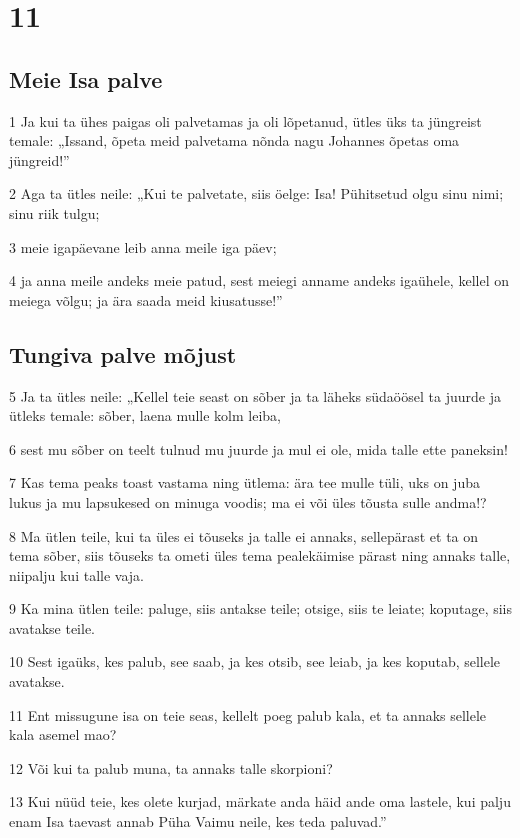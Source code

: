 \chapter{11}

\section*{Meie Isa palve}

\par 1 Ja kui ta ühes paigas oli palvetamas ja oli lõpetanud, ütles üks ta jüngreist temale: „Issand, õpeta meid palvetama nõnda nagu Johannes õpetas oma jüngreid!”
\par 2 Aga ta ütles neile: „Kui te palvetate, siis öelge: Isa! Pühitsetud olgu sinu nimi; sinu riik tulgu;
\par 3 meie igapäevane leib anna meile iga päev;
\par 4 ja anna meile andeks meie patud, sest meiegi anname andeks igaühele, kellel on meiega võlgu; ja ära saada meid kiusatusse!”

\section*{Tungiva palve mõjust}

\par 5 Ja ta ütles neile: „Kellel teie seast on sõber ja ta läheks südaöösel ta juurde ja ütleks temale: sõber, laena mulle kolm leiba,
\par 6 sest mu sõber on teelt tulnud mu juurde ja mul ei ole, mida talle ette paneksin!
\par 7 Kas tema peaks toast vastama ning ütlema: ära tee mulle tüli, uks on juba lukus ja mu lapsukesed on minuga voodis; ma ei või üles tõusta sulle andma!?
\par 8 Ma ütlen teile, kui ta üles ei tõuseks ja talle ei annaks, sellepärast et ta on tema sõber, siis tõuseks ta ometi üles tema pealekäimise pärast ning annaks talle, niipalju kui talle vaja.
\par 9 Ka mina ütlen teile: paluge, siis antakse teile; otsige, siis te leiate; koputage, siis avatakse teile.
\par 10 Sest igaüks, kes palub, see saab, ja kes otsib, see leiab, ja kes koputab, sellele avatakse.
\par 11 Ent missugune isa on teie seas, kellelt poeg palub kala, et ta annaks sellele kala asemel mao?
\par 12 Või kui ta palub muna, ta annaks talle skorpioni?
\par 13 Kui nüüd teie, kes olete kurjad, märkate anda häid ande oma lastele, kui palju enam Isa taevast annab Püha Vaimu neile, kes teda paluvad.”

